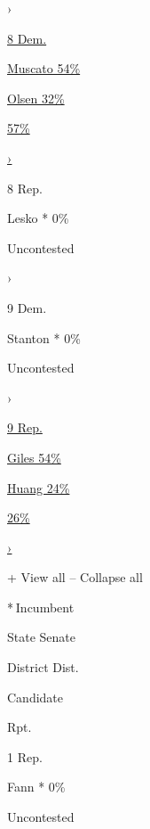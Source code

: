 ›

\href{https://www.nytimes.com/interactive/2020/08/04/us/elections/results-arizona-house-district-8-primary-election.html}{8
Dem.}

\href{https://www.nytimes.com/interactive/2020/08/04/us/elections/results-arizona-house-district-8-primary-election.html}{
Muscato 54\% }

\href{https://www.nytimes.com/interactive/2020/08/04/us/elections/results-arizona-house-district-8-primary-election.html}{
Olsen 32\% }

\href{https://www.nytimes.com/interactive/2020/08/04/us/elections/results-arizona-house-district-8-primary-election.html}{57\%}

\href{https://www.nytimes.com/interactive/2020/08/04/us/elections/results-arizona-house-district-8-primary-election.html}{›}

8 Rep.

 Lesko * 0\%

Uncontested

›

9 Dem.

 Stanton * 0\%

Uncontested

›

\href{https://www.nytimes.com/interactive/2020/08/04/us/elections/results-arizona-house-district-9-primary-election.html}{9
Rep.}

\href{https://www.nytimes.com/interactive/2020/08/04/us/elections/results-arizona-house-district-9-primary-election.html}{
Giles 54\% }

\href{https://www.nytimes.com/interactive/2020/08/04/us/elections/results-arizona-house-district-9-primary-election.html}{
Huang 24\% }

\href{https://www.nytimes.com/interactive/2020/08/04/us/elections/results-arizona-house-district-9-primary-election.html}{26\%}

\href{https://www.nytimes.com/interactive/2020/08/04/us/elections/results-arizona-house-district-9-primary-election.html}{›}

+ View all -- Collapse all

* Incumbent~

State Senate

District Dist.

Candidate

Rpt.

1 Rep.

 Fann * 0\%

Uncontested

